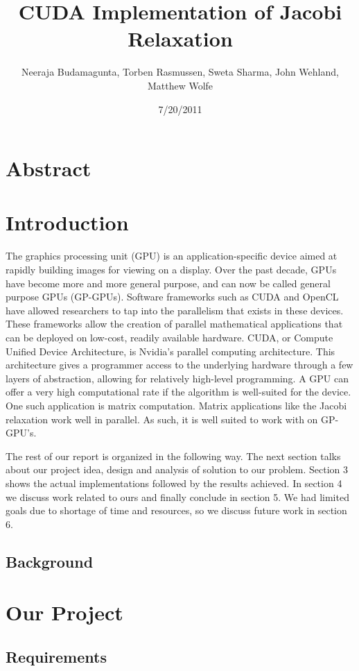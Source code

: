 \documentclass[11pt, twocolumn]{article}
\title{CUDA Implementation of Jacobi Relaxation}
\author{Neeraja Budamagunta, Torben Rasmussen, Sweta Sharma, John Wehland, Matthew Wolfe}
\date{7/20/2011}
\begin{document}
\maketitle
\section{Abstract}
\section{Introduction} %
The graphics processing unit (GPU) is an application-specific device aimed at rapidly building images for viewing on a display.
Over the past decade, GPUs have become more and more general purpose, and can now be called general purpose GPUs (GP-GPUs).
Software frameworks such as CUDA and OpenCL have allowed researchers to tap into the parallelism that exists in these devices.
These frameworks allow the creation of parallel mathematical applications that can be deployed on low-cost, readily available hardware.
CUDA, or Compute Unified Device Architecture, is Nvidia's parallel computing architecture.
This architecture gives a programmer access to the underlying hardware through a few layers of abstraction, allowing for relatively high-level programming.
A GPU can offer a very high computational rate if the algorithm is well-suited for the device.
One such application is matrix computation.
Matrix applications like the Jacobi relaxation work well in parallel.
As such, it is well suited to work with on GP-GPU’s.

The rest of our report is organized in the following way.
The next section talks about our project idea, design and analysis of solution to our problem.
Section 3 shows the actual implementations followed by the results achieved.
In section 4 we discuss work related to ours and finally conclude in section 5.
We had limited goals due to shortage of time and resources, so we discuss future work in section 6.

    \subsection{Background} %

\section{Our Project}
    \subsection{Requirements} %
\end{document}
